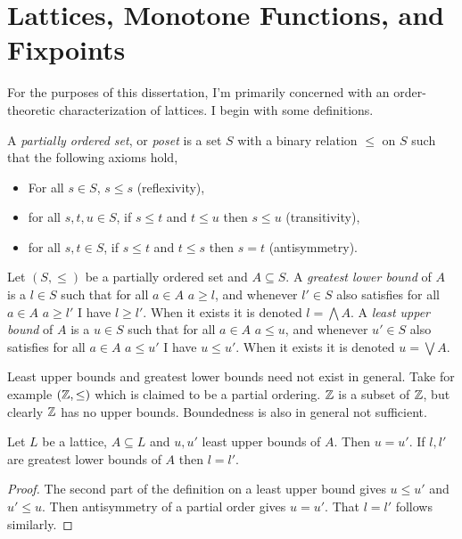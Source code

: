 \section{Lattices, Monotone Functions, and Fixpoints}
For the purposes of this dissertation, I'm primarily concerned with an order-theoretic characterization of lattices.
I begin with some definitions.
\begin{definition}[Poset]\label{posetdef}
  A \emph{partially ordered set}, or \emph{poset} is a set $S$ with a binary relation $\leq$ on $S$ such that the following axioms hold,
  \begin{itemize}
    \item For all $s \in S$, $s \leq s$ (reflexivity),
    \item for all $s, t, u \in S$, if $s \leq t$ and $t \leq u$ then $s \leq u$ (transitivity),
    \item for all $s, t \in S$, if $s \leq t$ and $t \leq s$ then $s = t$ (antisymmetry).
  \end{itemize}
\end{definition}
\begin{definition}
  Let $(S, \leq)$ be a partially ordered set and $A \subseteq S$. A \emph{greatest lower bound} of $A$ is
  a $l \in S$ such that for all $a \in A$ $a \geq l$, and whenever $l' \in S$ also satisfies for all $a \in A$
  $a \geq l'$ I have $l \geq l'$. When it exists it is denoted $l = \bigwedge A$. 
  A \emph{least upper bound} of $A$ is a $u \in S$ such that for all $a \in A$ $a \leq u$, and whenever $u' \in S$ also satisfies for all $a \in A$
  $a \leq u'$ I have $u \leq u'$. When it exists it is denoted $u = \bigvee A$.
\end{definition}
\begin{remark}
  Least upper bounds and greatest lower bounds need not exist in general. Take for example $(\mathbb{Z}, \leq)$ which
  is claimed to be a partial ordering. $\mathbb{Z}$ is a subset of $\mathbb{Z}$, but clearly $\mathbb{Z}$ has no upper bounds.
  Boundedness is also in general not sufficient. 
\end{remark}
\begin{lemma}
  Let $L$ be a lattice, $A \subseteq L$ and $u, u'$ least upper bounds of $A$. Then $u = u'$.
  If $l, l'$ are greatest lower bounds of $A$ then $l = l'$.
\end{lemma}
\begin{proof}
  The second part of the definition on a least upper bound gives $u \leq u'$ and $u' \leq u$. Then
  antisymmetry of a partial order gives $u = u'$. That $l = l'$ follows similarly.
\end{proof}
